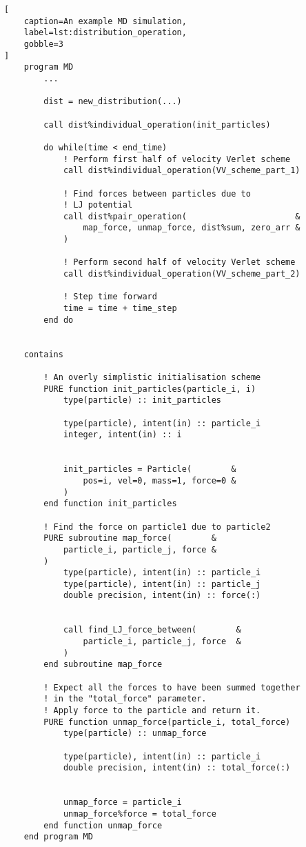 \begin{lstlisting}[
    caption=An example MD simulation,
    label=lst:distribution_operation,
    gobble=3
]
    program MD
        ...

        dist = new_distribution(...)

        call dist%individual_operation(init_particles)

        do while(time < end_time)
            ! Perform first half of velocity Verlet scheme
            call dist%individual_operation(VV_scheme_part_1)

            ! Find forces between particles due to
            ! LJ potential
            call dist%pair_operation(                      &
                map_force, unmap_force, dist%sum, zero_arr &
            )

            ! Perform second half of velocity Verlet scheme
            call dist%individual_operation(VV_scheme_part_2)

            ! Step time forward
            time = time + time_step
        end do


    contains

        ! An overly simplistic initialisation scheme
        PURE function init_particles(particle_i, i)
            type(particle) :: init_particles

            type(particle), intent(in) :: particle_i
            integer, intent(in) :: i


            init_particles = Particle(        &
                pos=i, vel=0, mass=1, force=0 &
            )
        end function init_particles

        ! Find the force on particle1 due to particle2
        PURE subroutine map_force(        &
            particle_i, particle_j, force &
        )
            type(particle), intent(in) :: particle_i
            type(particle), intent(in) :: particle_j
            double precision, intent(in) :: force(:)


            call find_LJ_force_between(        &
                particle_i, particle_j, force  &
            )
        end subroutine map_force

        ! Expect all the forces to have been summed together
        ! in the "total_force" parameter.
        ! Apply force to the particle and return it.
        PURE function unmap_force(particle_i, total_force)
            type(particle) :: unmap_force

            type(particle), intent(in) :: particle_i
            double precision, intent(in) :: total_force(:)


            unmap_force = particle_i
            unmap_force%force = total_force
        end function unmap_force
    end program MD
\end{lstlisting}


